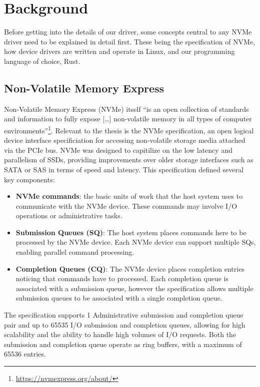 \chapter{Background}

Before getting into the details of our driver, some concepts central to any NVMe driver need to be explained in detail first. These being the specification of NVMe, how device drivers are written and operate in Linux, and our programming language of choice, Rust.

\section{Non-Volatile Memory Express}
Non-Volatile Memory Express (NVMe) itself ``is an open collection of standards and information to fully expose [\ldots] non-volatile memory in all types of computer environments''\footnote{\url{https://nvmexpress.org/about/}}. Relevant to the thesis is the NVMe specification, an open logical device interface specificiation for accessing non-volatile storage media attached via the PCIe bus. NVMe was designed to capitilize on the low latency and parallelism of SSDs, providing improvements over older storage interfaces such as SATA or SAS in terms of speed and latency. This specification defined several key components:
\begin{itemize}
        \item \textbf{NVMe commands}: the basic units of work that the host system uses to communicate with the NVMe device. These commands may involve I/O operations or administrative tasks.
        \item \textbf{Submission Queues (SQ)}: The host system places commands here to be processed by the NVMe device. Each NVMe device can support multiple SQs, enabling parallel command processing.
        \item \textbf{Completion Queues (CQ)}: The NVMe device places completion entries noticing that commands have to processed. Each completion queue is associated with a submission queue, however the specification allows multiple submission queues to be associated with a single completion queue.
\end{itemize}

The specification supports 1 Administrative submission and completion queue pair and up to 65535 I/O submission and completion queues, allowing for high scalability and the ability to handle high volumes of I/O requests. Both the submission and completion queue operate as ring buffers, with a maximum of 65536 entries.

